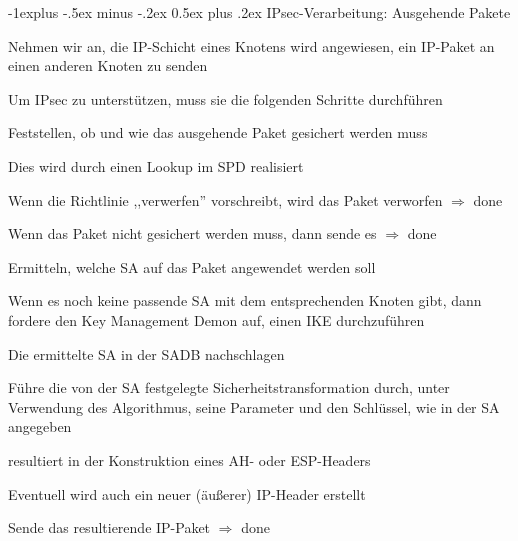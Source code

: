 \documentclass[a4paper]{article}
\makeatletter
\renewcommand{\subsection}{\@startsection{subsection}{2}{0mm}%
 {-1explus -.5ex minus -.2ex}%
 {0.5ex plus .2ex}%
 {\normalfont\normalsize\bfseries}}
\makeatother
\begin{document}
\begin{multicols}{3}
      \subsection{IPsec-Verarbeitung: Ausgehende Pakete}
      \begin{itemize*}
            \item Nehmen wir an, die IP-Schicht eines Knotens wird angewiesen, ein IP-Paket an einen anderen Knoten zu senden
            \item Um IPsec zu unterstützen, muss sie die folgenden Schritte durchführen
            \item Feststellen, ob und wie das ausgehende Paket gesichert werden muss
            \begin{itemize*}
                  \item Dies wird durch einen Lookup im SPD realisiert
                  \item Wenn die Richtlinie ,,verwerfen'' vorschreibt, wird das Paket verworfen $\Rightarrow$ done
                  \item Wenn das Paket nicht gesichert werden muss, dann sende es $\Rightarrow$ done
            \end{itemize*}
            \item Ermitteln, welche SA auf das Paket angewendet werden soll
            \begin{itemize*}
                  \item Wenn es noch keine passende SA mit dem entsprechenden Knoten gibt, dann fordere den Key Management Demon auf, einen IKE durchzuführen
            \end{itemize*}
            \item Die ermittelte SA in der SADB nachschlagen
            \item Führe die von der SA festgelegte Sicherheitstransformation durch, unter Verwendung des Algorithmus, seine Parameter und den Schlüssel, wie in der SA angegeben
            \begin{itemize*}
                  \item resultiert in der Konstruktion eines AH- oder ESP-Headers
                  \item Eventuell wird auch ein neuer (äußerer) IP-Header erstellt %
            \end{itemize*}
            \item Sende das resultierende IP-Paket $\Rightarrow$ done
      \end{itemize*}


\end{multicols}
\end{document}
